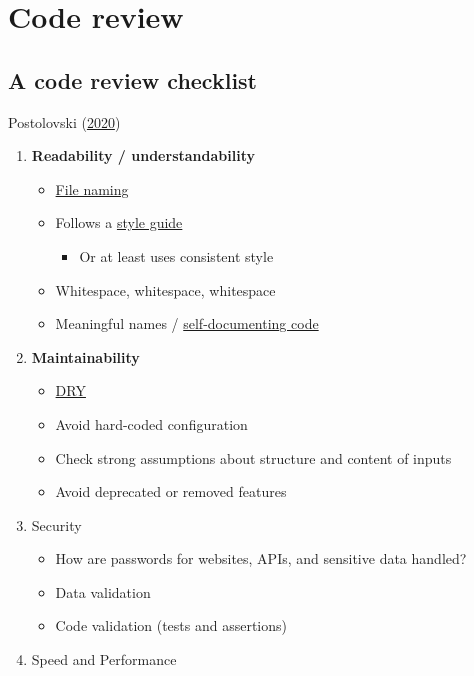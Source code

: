 \documentclass[
]{article}
\providecommand{\tightlist}{%
  \setlength{\itemsep}{0pt}\setlength{\parskip}{0pt}}
\begin{document}
\hypertarget{code-review}{%
\section{Code review}\label{code-review}}

\hypertarget{a-code-review-checklist}{%
\subsection{A code review checklist}\label{a-code-review-checklist}}

Postolovski (\protect\hyperlink{ref-PostolovskiYourCodeReview2020}{2020})

\begin{enumerate}
\def\labelenumi{\arabic{enumi}.}
\item
  \textbf{Readability / understandability}

  \begin{itemize}
  \tightlist
  \item
    \href{https://style.tidyverse.org/files.html}{File naming}
  \item
    Follows a \href{https://style.tidyverse.org/}{style guide}

    \begin{itemize}
    \tightlist
    \item
      Or at least uses consistent style
    \end{itemize}
  \item
    Whitespace, whitespace, whitespace
  \item
    Meaningful names / \href{https://dev.to/woubuc/self-documenting-is-a-myth-and-how-to-make-your-code-self-documenting-3h2n}{self-documenting code}
  \end{itemize}
\item
  \textbf{Maintainability}

  \begin{itemize}
  \tightlist
  \item
    \href{https://en.wikipedia.org/wiki/Don\%27t_repeat_yourself}{DRY}
  \item
    Avoid hard-coded configuration
  \item
    Check strong assumptions about structure and content of inputs
  \item
    Avoid deprecated or removed features
  \end{itemize}
\item
  Security

  \begin{itemize}
  \tightlist
  \item
    How are passwords for websites, APIs, and sensitive data handled?
  \item
    Data validation
  \item
    Code validation (tests and assertions)
  \end{itemize}
\item
  Speed and Performance


\end{enumerate}
\end{document}
